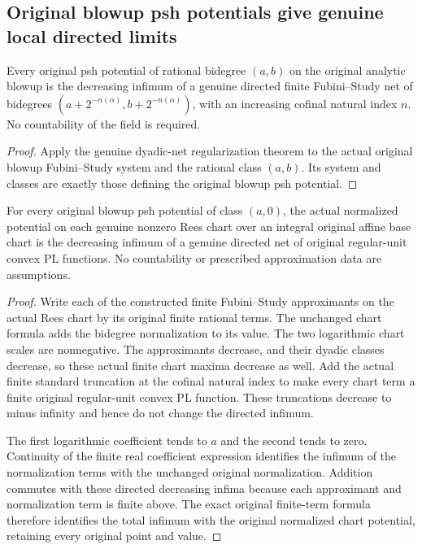 \subsection{Original blowup psh potentials give genuine local directed limits}

\begin{lemma}
\label{lem:fc-blowup-dyadic-finite-fs-net}
\leanok
{}
Every original psh potential of rational bidegree $(a,b)$ on the original
analytic blowup is the decreasing infimum of a genuine directed finite
Fubini--Study net of bidegrees $(a+2^{-n(\alpha)},b+2^{-n(\alpha)})$, with an
increasing cofinal natural index $n$. No countability of the field is required.
\end{lemma}
\begin{proof}
Apply the genuine dyadic-net regularization theorem to the actual original
blowup Fubini--Study system and the rational class $(a,b)$. Its system and
classes are exactly those defining the original blowup psh potential.
\end{proof}

\begin{lemma}
\label{lem:fc-normalized-chart-convex-pl-net}
\leanok
{}
For every original blowup psh potential of class $(a,0)$, the actual normalized
potential on each genuine nonzero Rees chart over an integral original
affine base chart is the decreasing infimum of a
genuine directed net of original regular-unit convex PL functions. No
countability or prescribed approximation data are assumptions.
\end{lemma}
\begin{proof}
Write each of the constructed finite Fubini--Study approximants on the actual
Rees chart by its original finite rational terms. The unchanged chart formula
adds the bidegree normalization to its value. The two logarithmic chart scales
are nonnegative. The approximants decrease, and their dyadic classes decrease,
so these actual finite chart maxima decrease as well. Add the actual finite
standard truncation at the cofinal natural index to make every chart term a
finite original regular-unit convex PL function. These truncations decrease
to minus infinity and hence do not change the directed infimum.

The first logarithmic coefficient tends to $a$ and the second tends to zero.
Continuity of the finite real coefficient expression identifies the infimum
of the normalization terms with the unchanged original normalization.
Addition commutes with these directed decreasing infima because each
approximant and normalization term is finite above. The exact original
finite-term formula therefore identifies the total infimum with the original
normalized chart potential, retaining every original point and value.
\end{proof}

